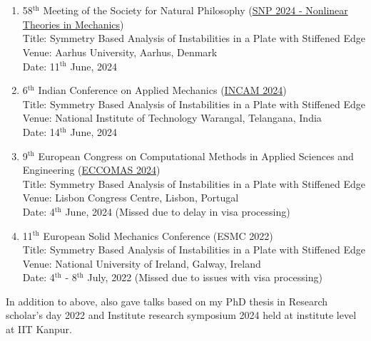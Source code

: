 \documentclass[a4paper,10pt]{article}
\newcommand{\mysectionast}[1]{\section*{\colorbox{lightgray}{\makebox[\linewidth][s]{#1\hfill}}}}
\begin{document}
	\mysectionast{Talks}
	\begin{enumerate}
		\item 58$^{\mathrm{th}}$ Meeting of the Society for Natural Philosophy (\href{https://sites.google.com/view/snp2024}{SNP 2024 - Nonlinear Theories in Mechanics})\\
		Title: Symmetry Based Analysis of Instabilities in a Plate with Stiffened Edge\\
		Venue: Aarhus University, Aarhus, Denmark\\
		Date: 11$^{\mathrm{th}}$ June, 2024 
		\item  6$^{\mathrm{th}}$ Indian Conference on Applied Mechanics 
		(\href{https://incam.isam.co.in/schedule}{INCAM 2024})\\
		Title: Symmetry Based Analysis of Instabilities in a Plate with Stiffened Edge\\
		Venue: National Institute of Technology Warangal, Telangana, India\\
		Date: 14$^{\mathrm{th}}$ June, 2024
		\item 9$^{\mathrm{th}}$ European Congress on Computational Methods in Applied Sciences and Engineering (\href{https://eccomas2024.org/event/contribution/9208c324-b3bd-11ee-ac5b-000c29ddfc0c}{ECCOMAS 2024})\\
		Title: Symmetry Based Analysis of Instabilities in a Plate with Stiffened Edge\\
		Venue: Lisbon Congress Centre, Lisbon, Portugal\\
		Date: 4$^{\mathrm{th}}$ June, 2024 (Missed due to delay in visa processing)
		\item 11$^{\mathrm{th}}$ European Solid Mechanics Conference (ESMC 2022)\\
		Title: Symmetry Based Analysis of Instabilities in a Plate with Stiffened Edge\\
		Venue: National University of Ireland, Galway, Ireland \\
		Date: 4$^{\mathrm{th}}$ - 8$^{\mathrm{th}}$ July, 2022 (Missed due to issues with visa processing)
	\end{enumerate}
	In addition to above, also gave talks based on my PhD thesis in Research scholar's day 2022 and Institute research symposium 2024 held at institute level at IIT Kanpur.
	
\end{document}
